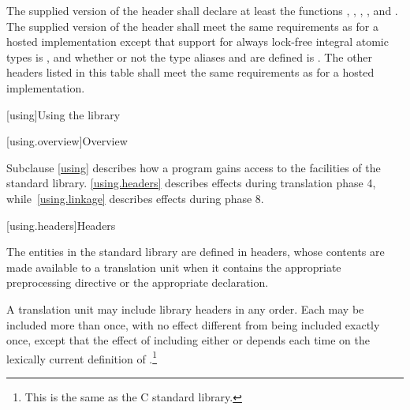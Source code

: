 \pnum
The supplied version of the header
%
shall declare at least the functions
%
,
%
,
%
,
%
,
and
%
.
The supplied version of the header 
shall meet the same requirements as for a hosted implementation
except that support for
always lock-free integral atomic types
is , and
whether or not the type aliases  and
 are defined
is .
The other headers listed in this table
shall meet the same requirements as for a hosted implementation.

[using]{Using the library}

[using.overview]{Overview}

\pnum
Subclause \ref{using} describes how a \Cpp{} program gains access to the facilities of the
\Cpp{} standard library. \ref{using.headers} describes effects during translation
phase 4, while~\ref{using.linkage} describes effects during phase
8.

[using.headers]{Headers}

\pnum
The entities in the \Cpp{} standard library are defined in headers,
whose contents are made available to a translation unit when it contains the appropriate
%
%
preprocessing directive
or the appropriate
%
 declaration.

\pnum
A translation unit may include library headers in any order.
%
Each may be included more than once, with no effect different from
being included exactly once, except that the effect of including either
or
depends each time on the lexically
%
%
current definition of
%
%
.\footnote{This is the same as the C standard library.}

